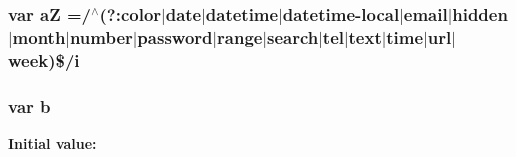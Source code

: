 \subsubsection[{a\-Z}]{\setlength{\rightskip}{0pt plus 5cm}var a\-Z =/$^\wedge$(?\-:color$\vert$date$\vert$datetime$\vert$datetime-\/local$\vert$email$\vert$hidden$\vert$month$\vert$number$\vert$password$\vert$range$\vert$search$\vert$tel$\vert$text$\vert$time$\vert$url$\vert$week)\$/i}\label{jquery_8js_ac87125cdee1a5e57da4ef619af49bc7d}
\subsubsection[{b}]{\setlength{\rightskip}{0pt plus 5cm}var b}\label{jquery_8js_aa4026ad5544b958e54ce5e106fa1c805}
{\bfseries Initial value\-:}
